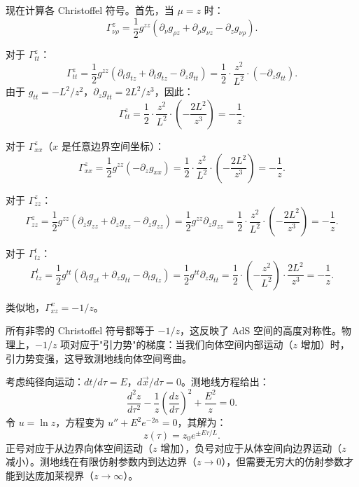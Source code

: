 现在计算各 Christoffel 符号。首先，当 $\mu = z$ 时：
\begin{equation}
    \Gamma^z_{\nu\rho} = \frac{1}{2} g^{zz} (\partial_\nu g_{\rho z} + \partial_\rho g_{\nu z} - \partial_z g_{\nu\rho}).
\end{equation}

对于 $\Gamma^z_{tt}$：
\begin{equation}
    \Gamma^z_{tt} = \frac{1}{2} g^{zz} (\partial_t g_{tz} + \partial_t g_{tz} - \partial_z g_{tt}) = \frac{1}{2} \cdot \frac{z^2}{L^2} \cdot \left(-\partial_z g_{tt}\right).
\end{equation}
由于 $g_{tt} = -L^2/z^2$，$\partial_z g_{tt} = 2L^2/z^3$，因此：
\begin{equation}
    \Gamma^z_{tt} = \frac{1}{2} \cdot \frac{z^2}{L^2} \cdot \left(-\frac{2L^2}{z^3}\right) = -\frac{1}{z}.
\end{equation}

对于 $\Gamma^z_{xx}$（$x$ 是任意边界空间坐标）：
\begin{equation}
    \Gamma^z_{xx} = \frac{1}{2} g^{zz} (-\partial_z g_{xx}) = \frac{1}{2} \cdot \frac{z^2}{L^2} \cdot \left(-\frac{2L^2}{z^3}\right) = -\frac{1}{z}.
\end{equation}

对于 $\Gamma^z_{zz}$：
\begin{equation}
    \Gamma^z_{zz} = \frac{1}{2} g^{zz} (\partial_z g_{zz} + \partial_z g_{zz} - \partial_z g_{zz}) = \frac{1}{2} g^{zz} \partial_z g_{zz} = \frac{1}{2} \cdot \frac{z^2}{L^2} \cdot \left(-\frac{2L^2}{z^3}\right) = -\frac{1}{z}.
\end{equation}

对于 $\Gamma^t_{tz}$：
\begin{equation}
    \Gamma^t_{tz} = \frac{1}{2} g^{tt} (\partial_t g_{zt} + \partial_z g_{tt} - \partial_t g_{tz}) = \frac{1}{2} g^{tt} \partial_z g_{tt} = \frac{1}{2} \cdot \left(-\frac{z^2}{L^2}\right) \cdot \frac{2L^2}{z^3} = -\frac{1}{z}.
\end{equation}

类似地，$\Gamma^x_{xz} = -1/z$。

\begin{remark}
所有非零的 Christoffel 符号都等于 $-1/z$，这反映了 AdS 空间的高度对称性。物理上，$-1/z$ 项对应于"引力势"的梯度：当我们向体空间内部运动（$z$ 增加）时，引力势变强，这导致测地线向体空间弯曲。
\end{remark}

\begin{example}[纯径向测地线]
考虑纯径向运动：$dt/d\tau = E$，$d\vec{x}/d\tau = 0$。测地线方程给出：
\begin{equation}
    \frac{d^2 z}{d\tau^2} - \frac{1}{z} \left(\frac{dz}{d\tau}\right)^2 + \frac{E^2}{z} = 0.
\end{equation}
令 $u = \ln z$，方程变为 $u'' + E^2 e^{-2u} = 0$，其解为：
\begin{equation}
    z(\tau) = z_0 e^{\pm E \tau / L}.
\end{equation}
正号对应于从边界向体空间运动（$z$ 增加），负号对应于从体空间向边界运动（$z$ 减小）。测地线在有限仿射参数内到达边界（$z \to 0$），但需要无穷大的仿射参数才能到达庞加莱视界（$z \to \infty$）。
\end{example}

